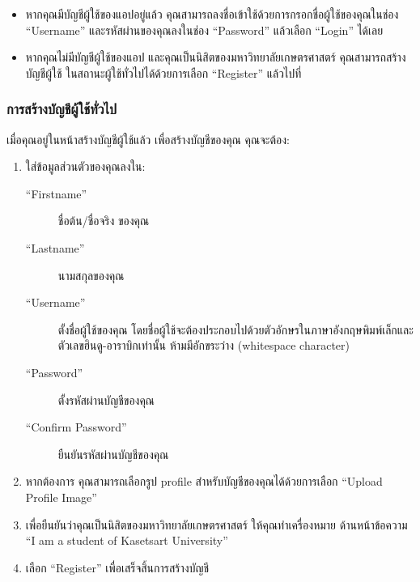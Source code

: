 \begin{itemize}
    \item หากคุณมีบัญชีผู้ใช้ของแอปอยู่แล้ว
คุณสามารถลงชื่อเข้าใช้ด้วยการกรอกชื่อผู้ใช้ของคุณในช่อง ``Username'' และรหัสผ่านของคุณลงในช่อง ``Password''
แล้วเลือก ``Login'' ได้เลย
    \item หากคุณไม่มีบัญชีผู้ใช้ของแอป และคุณเป็นนิสิตของมหาวิทยาลัยเกษตรศาสตร์ คุณสามารถสร้างบัญชีผู้ใช้\relax
ในสถานะผู้ใช้ทั่วไปได้ด้วยการเลือก ``Register'' แล้วไปที่ 
\end{itemize}

\subsubsection{การสร้างบัญชีผู้ใช้ทั่วไป}\label{subsubsec:register-consumer-acct}


เมื่อคุณอยู่ในหน้าสร้างบัญชีผู้ใช้แล้ว เพื่อสร้างบัญชีของคุณ คุณจะต้อง:

\begin{enumerate}
    \item ใส่ข้อมูลส่วนตัวของคุณลงใน:
        \begin{description}
            \item[``Firstname''] ชื่อต้น/ชื่อจริง ของคุณ
            \item[``Lastname''] นามสกุลของคุณ
            \item[``Username''] \parbox[t]{0.5\textwidth}{ตั้งชื่อผู้ใช้ของคุณ โดยชื่อผู้ใช้จะต้องประกอบไปด้วยตัวอักษรในภาษาอังกฤษพิมพ์เล็กและตัวเลขฮินดู-อาราบิกเท่านั้น ห้ามมีอักขระว่าง (whitespace character)}
            \item[``Password''] ตั้งรหัสผ่านบัญชีของคุณ
            \item[``Confirm Password''] ยืนยันรหัสผ่านบัญชีของคุณ
        \end{description}
    \item หากต้องการ คุณสามารถเลือกรูป profile สำหรับบัญชีของคุณได้ด้วยการเลือก ``Upload Profile Image''
    \item เพื่อยืนยันว่าคุณเป็นนิสิตของมหาวิทยาลัยเกษตรศาสตร์ ให้คุณทำเครื่องหมาย \checkmark{} ด้านหน้าข้อความ ``I am a student of Kasetsart University''
    \item เลือก ``Register'' เพื่อเสร็จสิ้นการสร้างบัญชี
\end{enumerate}

